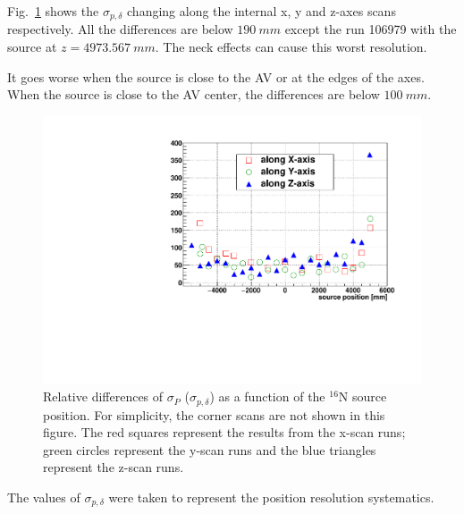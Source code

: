 Fig.~\ref{pos_relative_sigma_biasesVsPositions} shows the $\sigma_{p,\delta}$ changing along the internal x, y and z-axes scans respectively. All the differences are below $190~mm$ except the run 106979 with the source at $z=4973.567~mm$. The neck effects can cause this worst resolution. 

It goes worse when the source is close to the AV or at the edges of the axes. When the source is close to the AV center, the differences are below $100~mm$.

\begin{figure}[!htb]
	\centering
	\includegraphics[width=16cm]{N16_6176_pos_sigmaP_data_mc.pdf}
	\caption[Relative differences of $\sigma_P$ ($\sigma_{p,\delta}$) as a function of the $^{16}$N source position.]{Relative differences of $\sigma_P$ ($\sigma_{p,\delta}$) as a function of the $^{16}$N source position. For simplicity, the corner scans are not shown in this figure. The red squares represent the results from the x-scan runs; green circles represent the y-scan runs and the blue triangles represent the z-scan runs.}
	\label{pos_relative_sigma_biasesVsPositions}
\end{figure}

The values of $\sigma_{p,\delta}$ were taken to represent the position resolution systematics.

